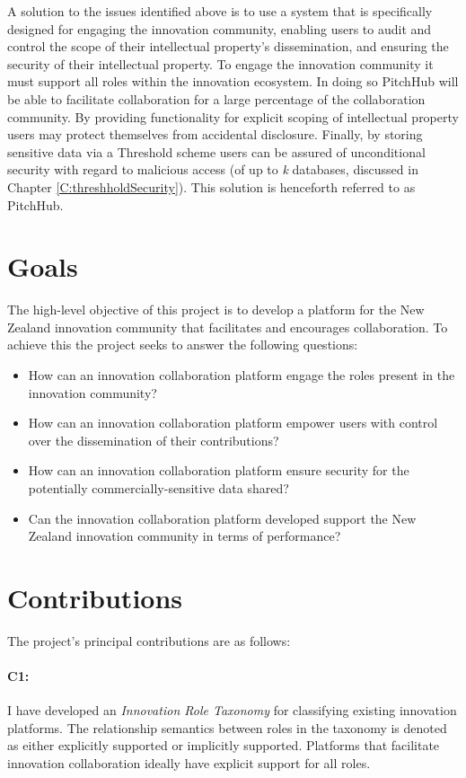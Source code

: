 A solution to the issues identified above is to use a system that is specifically designed for engaging the innovation community, enabling users to audit and control the scope of their intellectual property's dissemination, and ensuring the security of their intellectual property. To engage the innovation community it must support all roles within the innovation ecosystem. In doing so PitchHub will be able to facilitate collaboration for a large percentage of the collaboration community. By providing functionality for explicit scoping of intellectual property users may protect themselves from accidental disclosure. Finally, by storing sensitive data via a Threshold scheme users can be assured of unconditional security with regard to malicious access (of up to \textit{k} databases, discussed in Chapter \ref{C:threshholdSecurity}). This solution is henceforth referred to as PitchHub.

\section{Goals}\label{S:goals}

The high-level objective of this project is to develop a platform for the New Zealand innovation community that facilitates and encourages collaboration. To achieve this the project seeks to answer the following questions: 

\begin{itemize}
  \item How can an innovation collaboration platform engage the roles present in the innovation community?
  \item How can an innovation collaboration platform empower users with control over the dissemination of their contributions?
  \item How can an innovation collaboration platform ensure security for the potentially commercially-sensitive data shared?
  \item Can the innovation collaboration platform developed support the New Zealand innovation community in terms of performance?
\end{itemize}

\section{Contributions}

The project's principal contributions are as follows:

\paragraph{C1:} I have developed an {\em Innovation Role Taxonomy} for classifying existing innovation platforms. The relationship semantics between roles in the taxonomy is denoted as either explicitly supported or implicitly supported. Platforms that facilitate innovation collaboration ideally have explicit support for all roles.

